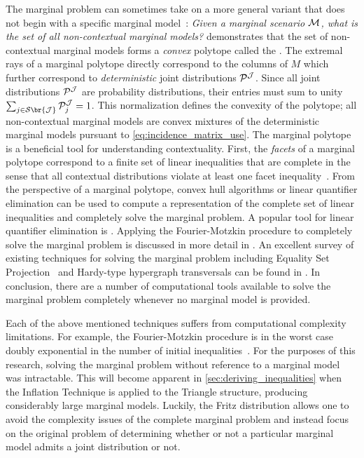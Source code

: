 \documentclass[aps, 10pt, english, twoside, pra, nofootinbib, tightenlines, longbibliography, superscriptaddress]{revtex4-1}
\renewcommand{\Events}[1]{\mathcal{S}\br{#1}} %
\begin{document}
    The marginal problem can sometimes take on a more general variant that does not begin with a specific marginal model~\cite{Abramsky_2012,Mansfield_2012,Fritz_2011}: \textit{Given a marginal scenario $\mathcal{M}$, what is the set of all non-contextual marginal models?} \citet{Pitowsky_1991} demonstrates that the set of non-contextual marginal models forms a \textit{convex} polytope called the . The extremal rays of a marginal polytope directly correspond to the columns of $M$ which further correspond to \textit{deterministic} joint distributions $\probvec^{\jointvar}$. Since all joint distributions $\probvec^{\jointvar}$ are probability distributions, their entries must sum to unity $\sum_{j \in \Events{\jointvar}} \probvec^{\jointvar}_j = 1$. This normalization defines the convexity of the polytope; all non-contextual marginal models are convex mixtures of the deterministic marginal models pursuant to \cref{eq:incidence_matrix_use}. The marginal polytope is a beneficial tool for understanding contextuality. First, the \textit{facets} of a marginal polytope correspond to a finite set of linear inequalities that are complete in the sense that all contextual distributions violate at least one facet inequality~\cite{Brunner_2013}. From the perspective of a marginal polytope, convex hull algorithms or linear quantifier elimination can be used to compute a representation of the complete set of linear inequalities and completely solve the marginal problem. A popular tool for linear quantifier elimination is  \cite{Dantzig_1973,Inflation,Abramsky_2012,jones_2004}. Applying the Fourier-Motzkin procedure to completely solve the marginal problem is discussed in more detail in \citet{Fritz_2011}. An excellent survey of existing techniques for solving the marginal problem including Equality Set Projection~\cite{jones_2004} and Hardy-type hypergraph transversals can be found in \citet{Inflation}. In conclusion, there are a number of computational tools available to solve the marginal problem completely whenever no marginal model is provided.

    Each of the above mentioned techniques suffers from computational complexity limitations. For example, the Fourier-Motzkin procedure is in the worst case doubly exponential in the number of initial inequalities~\cite{Dantzig_1973}. For the purposes of this research, solving the marginal problem without reference to a marginal model was intractable. This will become apparent in \cref{sec:deriving_inequalities} when the Inflation Technique is applied to the Triangle structure, producing considerably large marginal models. Luckily, the Fritz distribution allows one to avoid the complexity issues of the complete marginal problem and instead focus on the original problem of determining whether or not a particular marginal model admits a joint distribution or not.
\end{document}
